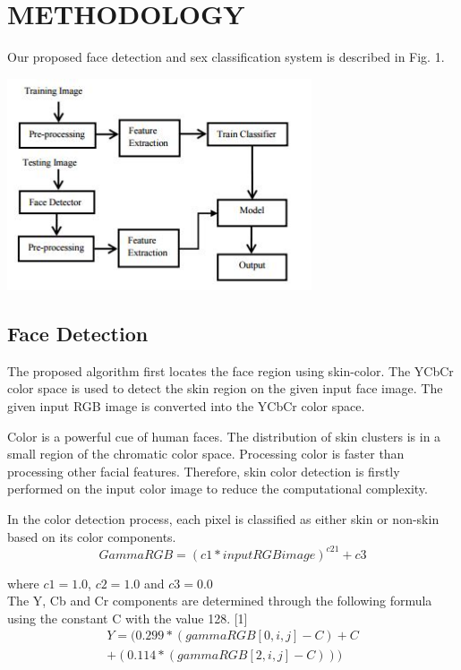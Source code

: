 \documentclass[journal]{IEEEtran}
\begin{document}
	\section{\textbf{METHODOLOGY}}
	Our proposed face detection and sex classification system is
	described in Fig. 1.\\
	\begin{minipage}{\linewidth}
		\centering
		\includegraphics[width = 90mm]{Methodology.JPG}
	\end{minipage} 
	
	\subsection{\textbf{Face Detection}}
	   The proposed algorithm first locates the face region
	using skin-color. The YCbCr color space is used to detect
	the skin region on the given input face image. The given
	input RGB image is converted into the YCbCr color
	space.
	
	
	  Color is a powerful cue of human faces. The
	distribution of skin clusters is in a small region of the
	chromatic color space. Processing color is faster than
	processing other facial features. Therefore, skin color
	detection is firstly performed on the input color image to
	reduce the computational complexity.
	
	In the color detection process, each pixel is classified as
	either skin or non-skin based on its color components.
	 \begin{equation}
	  GammaRGB=(c1*inputRGBimage)^{c21} + c3
	 \end{equation}
	
	where $c1=1.0$, $c2=1.0$ and $c3=0.0$\vspace{1mm}\\
	 
	 The Y, Cb and Cr components are determined through
	the following formula using the constant C with the value
	128. [1]
	\begin{equation}
	\begin{split}
	Y=(0.299*(gammaRGB[0,i,j]-C)+C\\
	+(0.114*(gammaRGB[2,i,j]-C)))
	\end{split}
	\end{equation}
	
\end{document}
